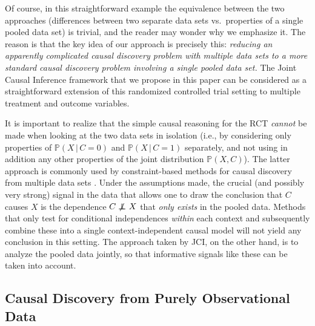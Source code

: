 \documentclass[twoside,11pt]{article}
\DeclareMathOperator*{\nCI}{{\,\not\mkern-1mu\perp\mkern-12mu\perp\,}}
\newcommand{\Prb}{\mathbb{P}}
\newcommand\given{\,|\,}
\newcommand{\Joris}[1]{{\color{blue}#1}}
\newcommand{\Sara}[1]{{\color{purple}#1}}
\begin{document}
Of course, in this straightforward example the equivalence between the two approaches (differences between
two separate data sets vs.\ properties of a single pooled data set) is trivial, and the reader may wonder
why we emphasize it. The reason is that the key idea of our approach is precisely this: \emph{reducing
an apparently complicated causal discovery problem with multiple data sets to a more 
standard causal discovery problem involving a single pooled data set.}
The Joint Causal Inference framework that we propose in this paper can be considered as a straightforward
extension of this randomized controlled trial setting to multiple treatment and outcome variables.

It is important to realize that the simple causal reasoning for the RCT \emph{cannot} be made when looking at the two data sets in isolation (i.e., by considering only properties of $\Prb(X \given C=0)$ and $\Prb(X \given C=1)$ separately, 
and not using in addition any other properties of the joint distribution $\Prb(X,C)$). The latter approach
is commonly used by constraint-based methods for causal discovery from multiple data sets 
\citep[e.g.,][]{ION2009,Claassen++_NIPS2010,IOD2011,HEJ2014,triantafillou2015constraint,Rothenhausler++2015,ForreMooij_UAI_18}.
Under the assumptions made, the crucial (and possibly very strong) signal in the data that allows one to 
draw the conclusion that $C$ causes $X$ is the
dependence $C \nCI X$ that \emph{only exists} in the pooled data. 
Methods that only test for conditional independences \emph{within} each context
and subsequently combine these into a single context-independent causal model will not yield any conclusion 
in this setting. The approach taken by JCI, on the other hand, is to analyze the pooled data jointly,
so that informative signals like these can be taken into account.

\subsection{Causal Discovery from Purely Observational Data}\label{sec:CDobs}
\end{document}
